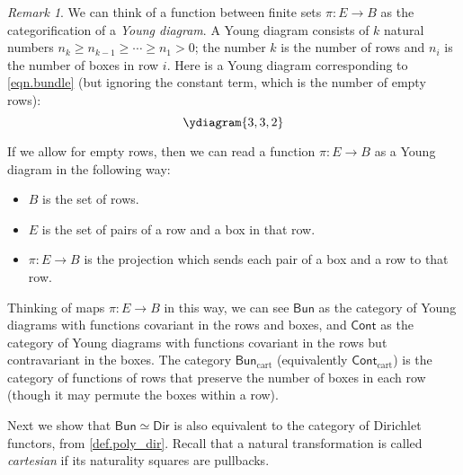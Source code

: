 \documentclass[11pt, article, one side]{memoir}
\theoremstyle{theorem}
\theoremstyle{definition}
\theoremstyle{remark}
\newtheorem{remark}[section]{Remark}
\newcommand{\Cat}[1]{\mathsf{#1}}%
\newcommand{\cont}{\Cat{Cont}}
\newcommand{\bun}{\Cat{Bun}}
\newcommand{\dir}{\Cat{Dir}}
\begin{document}
\begin{remark}
We can think of a function between finite sets $\pi : E \to B$ as the categorification of a \emph{Young diagram}. A Young diagram consists of $k$ natural numbers $n_k \geq n_{k-1} \geq \cdots \geq n_1 > 0$; the number $k$ is the number of rows and $n_i$ is the number of boxes in row $i$. Here is a Young diagram corresponding to \cref{eqn.bundle} (but ignoring the constant term, which is the number of empty rows):
\[
\ydiagram{3, 3, 2}
\]

If we allow for empty rows, then we can read a function $\pi : E \to B$ as a Young diagram in the following way:
\begin{itemize}
    \item $B$ is the set of rows.
    \item $E$ is the set of pairs of a row and a box in that row.
    \item $\pi : E \to B$ is the projection which sends each pair of a box and a row to that row.
\end{itemize}
Thinking of maps $\pi : E \to B$ in this way, we can see $\bun$ as the category of Young diagrams with functions covariant in the rows and boxes, and $\cont$ as the category of Young diagrams with functions covariant in the rows but contravariant in the boxes. The category $\bun_{\text{cart}}$ (equivalently $\cont_{\text{cart}}$) is the category of functions of rows that preserve the number of boxes in each row (though it may permute the boxes within a row).
\end{remark}

 Next we show that $\bun\simeq\dir$ is also equivalent to the category of Dirichlet functors, from \cref{def.poly_dir}. Recall that a natural transformation is called \emph{cartesian} if its naturality squares are pullbacks.
\end{document}
